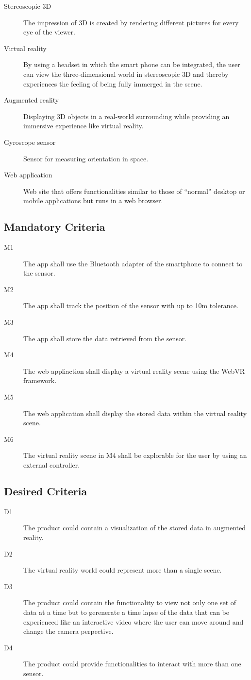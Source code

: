 \begin{description}
	\item[Stereoscopic 3D] The impression of 3D is created by rendering different pictures for every eye of the viewer.
	\item[Virtual reality] By using a headset in which the smart phone can be integrated, the user can view the three-dimensional world in stereoscopic 3D and thereby experiences the feeling of being fully immerged in the scene.
	\item[Augmented reality] Displaying 3D objects in a real-world surrounding while providing an immersive experience like virtual reality.
	\item[Gyroscope sensor] Sensor for measuring orientation in space.
	\item[Web application] Web site that offers functionalities similar to those of ``normal'' desktop or mobile applications but runs in a web browser.
\end{description}

\bigskip

\subsection{Mandatory Criteria}

\begin{description}
	\item[M1] The app shall use the Bluetooth adapter of the smartphone to connect to the sensor.
	\item[M2] The app shall track the position of the sensor with up to 10m tolerance.
	\item[M3] The app shall store the data retrieved from the sensor.
	\item[M4] The web appliaction shall display a virtual reality scene using the WebVR framework.
	\item[M5] The web application shall display the stored data within the virtual reality scene.
	\item[M6] The virtual reality scene in M4 shall be explorable for the user by using an external controller.
	
\end{description}

\subsection{Desired Criteria}

\begin{description}
  \item[D1] The product could contain a visualization of the stored data in augmented reality.
  \item[D2] The virtual reality world could represent more than a single scene.
  \item[D3] The product could contain the functionality to view not only one set of data at a time but to gerenerate a time lapse of the data that can be experienced like an interactive video where the user can move around and change the camera perpective.
  \item[D4] The product could provide functionalities to interact with more than one sensor.
\end{description}
